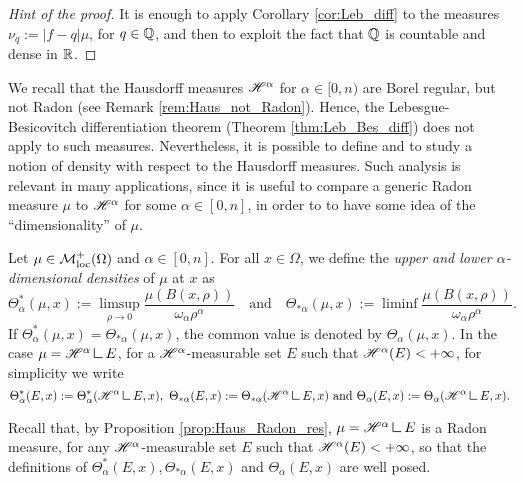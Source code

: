 \begin{proof}[Hint of the proof]
It is enough to apply Corollary \ref{cor:Leb_diff} to the measures $\nu_{q} := |f - q| \mu$, for $q \in \mathbb{Q}$, and then to exploit the fact that $\mathbb{Q}$ is countable and dense in $\mathbb{R}$.
\end{proof}

We recall that the Hausdorff measures $\mathscr{H}^{\alpha}$ for $\alpha \in [0, n)$ are Borel regular, but not Radon (see Remark \ref{rem:Haus_not_Radon}). Hence, the Lebesgue-Besicovitch differentiation theorem (Theorem \ref{thm:Leb_Bes_diff}) does not apply to such measures. Nevertheless, it is possible to define and to study a notion of density with respect to the Hausdorff measures. Such analysis is relevant in many applications, since it is useful to compare a generic Radon measure $\mu$ to $\mathscr{H}^{\alpha}$ for some $\alpha \in [0, n]$, in order to to have some idea of the ``dimensionality'' of $\mu$.

\begin{definition} \label{def:alpha_dimensional_densities}
Let $\mu \in \mathcal{M}^{+}_{\rm loc}(\Omega)$ and $\alpha \in [0, n]$. For all $x \in \Omega$, we define the {\em upper and lower $\alpha$-dimensional densities} of $\mu$ at $x$ as
\begin{equation*}
\Theta^{*}_{\alpha}(\mu, x) := \limsup_{\rho \to 0} \frac{\mu(B(x, \rho))}{\omega_{\alpha} \rho^{\alpha}} \quad \text{and} \quad \Theta_{* \alpha}(\mu, x) := \liminf \frac{\mu(B(x, \rho))}{\omega_{\alpha} \rho^{\alpha}}.
\end{equation*}
If $\Theta^{*}_{\alpha}(\mu, x) = \Theta_{* \alpha}(\mu, x)$, the common value is denoted by $\Theta_{\alpha}(\mu, x)$.
In the case $\mu = \Haus{\alpha} \res E$, for a $\mathscr{H}^{\alpha}$-measurable set $E$ such that $\mathscr{H}^{\alpha}(E) < + \infty$, for simplicity we write
\begin{equation*}
\Theta^{*}_{\alpha}(E, x) := \Theta^{*}_{\alpha}(\Haus{\alpha} \res E, x), \ \Theta_{* \alpha}(E, x) := \Theta_{* \alpha}(\Haus{\alpha} \res E, x) \text{ and }  \Theta_{\alpha}(E, x) := \Theta_{\alpha}(\Haus{\alpha} \res E, x).
\end{equation*}
\end{definition}
Recall that, by Proposition \ref{prop:Haus_Radon_res}, $\mu = \Haus{\alpha} \res E$ is a Radon measure, for any $\mathscr{H}^{\alpha}$-measurable set $E$ such that $\mathscr{H}^{\alpha}(E) < + \infty$, so that the definitions of $\Theta^{*}_{\alpha}(E, x), \Theta_{* \alpha}(E, x)$ and $\Theta_{\alpha}(E, x)$ are well posed.

